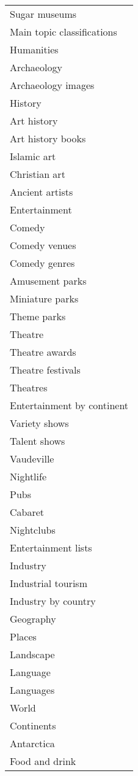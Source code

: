 \begin{table*}[h]
\centering
\begin{minipage}{0.48\textwidth}
\centering
\begin{tabular}{|l|}
\hline
Sugar museums \\
Main topic classifications \\
Humanities \\
Archaeology \\
Archaeology images \\
History \\
Art history \\
Art history books \\
Islamic art \\
Christian art \\
Ancient artists \\
Entertainment \\
Comedy \\
Comedy venues \\
Comedy genres \\
Amusement parks \\
Miniature parks \\
Theme parks \\
Theatre \\
Theatre awards \\
Theatre festivals \\
Theatres \\
Entertainment by continent \\
Variety shows \\
Talent shows \\
Vaudeville \\
Nightlife \\
Pubs \\
Cabaret \\
Nightclubs \\
Entertainment lists \\
Industry \\
Industrial tourism \\
Industry by country \\
Geography \\
Places \\
Landscape \\
Language \\
Languages \\
World \\
Continents \\
Antarctica \\
Food and drink \\

\end{tabular}
\end{minipage}
\end{table*}
